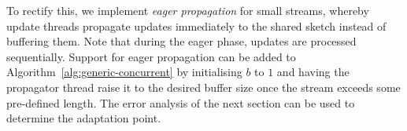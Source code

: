 To rectify this, we implement \emph{eager propagation} for small streams, 
whereby update threads propagate updates immediately to the shared sketch 
instead of buffering them. 
Note that during the eager phase, updates are processed sequentially. 
Support for eager propagation can be added to Algorithm~\ref{alg:generic-concurrent} 
by initialising $b$ to $1$ and having the propagator thread raise it to the
desired buffer size once the stream exceeds some pre-defined length. 
The error analysis of the next section can be used to determine the adaptation point.
